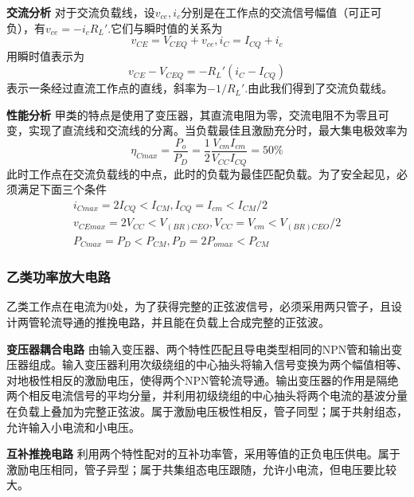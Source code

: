 \documentclass{ctexart}
\newcommand*{\noindbfquad}[1]{{\noindent \bf{#1} \qquad}}
\begin{document}
\noindbfquad{交流分析}
对于交流负载线，设$v_{ce},i_c$分别是在工作点的交流信号幅值（可正可负），有$v_{ce}=-i_c R_L'$.它们与瞬时值的关系为
\begin{equation}
    v_{CE}=V_{CEQ}+v_{ce},i_C=I_{CQ}+i_c
\end{equation}
用瞬时值表示为
\begin{equation}
    v_{CE}-V_{CEQ}=-R_L'(i_C -I_{CQ})
\end{equation}
表示一条经过直流工作点的直线，斜率为$-1/R_L'$.由此我们得到了交流负载线。

\noindbfquad{性能分析}
甲类的特点是使用了变压器，其直流电阻为零，交流电阻不为零且可变，实现了直流线和交流线的分离。当负载最佳且激励充分时，最大集电极效率为
\begin{equation}
    \eta_{Cmax}=\dfrac{P_o}{P_D}=\dfrac{1}{2}\dfrac{V_{cm}I_{cm}}{V_{CC}I_{CQ}}=50\%
\end{equation}
此时工作点在交流负载线的中点，此时的负载为最佳匹配负载。为了安全起见，必须满足下面三个条件
\begin{align}
    i_{Cmax}=2I_{CQ}<I_{CM},I_{CQ}=I_{cm}<I_{CM}/2\\
    v_{CEmax}=2V_{CC}<V_{(BR)CEO},V_{CC}=V_{cm}<V_{(BR)CEO}/2\\
    P_{Cmax}=P_D<P_{CM},P_D=2P_{omax}<P_{CM}
\end{align}
\subsubsection{乙类功率放大电路}
乙类工作点在电流为0处，为了获得完整的正弦波信号，必须采用两只管子，且设计两管轮流导通的推挽电路，并且能在负载上合成完整的正弦波。

\noindbfquad{变压器耦合电路} 
由输入变压器、两个特性匹配且导电类型相同的NPN管和输出变压器组成。输入变压器利用次级绕组的中心抽头将输入信号变换为两个幅值相等、对地极性相反的激励电压，使得两个NPN管轮流导通。输出变压器的作用是隔绝两个相反电流信号的平均分量，并利用初级绕组的中心抽头将两个电流的基波分量在负载上叠加为完整正弦波。属于激励电压极性相反，管子同型；属于共射组态，允许输入小电流和小电压。

\noindbfquad{互补推挽电路} 
利用两个特性配对的互补功率管，采用等值的正负电压供电。属于激励电压相同，管子异型；属于共集组态电压跟随，允许小电流，但电压要比较大。
\end{document}
